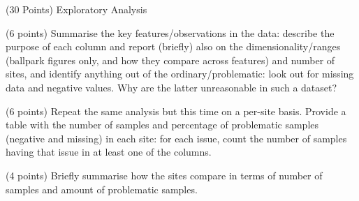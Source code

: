 \documentclass[12pt]{article}
\begin{document}





\clearpage





\begin{question}{\label{Q_EXPLORATORY}(30 Points) Exploratory Analysis}




\begin{subquestion}{(6 points) Summarise the key features/observations in the data: describe the purpose of each column and report (briefly) also on the dimensionality/ranges (ballpark figures only, and how they compare across features) and number of sites, and identify anything out of the ordinary/problematic: \ie look out for missing data and negative values. Why are the latter unreasonable in such a dataset? }






\end{subquestion}

\begin{subquestion}{(6 points) Repeat the same analysis but this time on a per-site basis. Provide a table with the number of samples and percentage of problematic samples (negative and missing) in each site: \ie for each issue, count the number of samples having that issue in at least one of the columns. }






\end{subquestion}

\begin{subquestion}{(4 points) Briefly summarise how the sites compare in terms of number of samples and amount of problematic samples.}




\end{subquestion}
\end{question}
\end{document}
